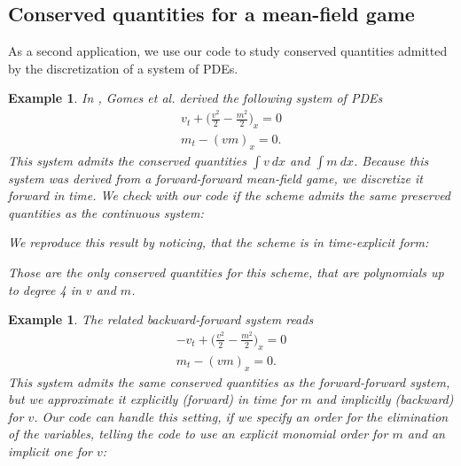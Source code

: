 \documentclass[sigconf,twocolumn]{acmart}
\newcommand{\1}{{\chi}}
\numberwithin{equation}{section}
\theoremstyle{thmlemcorr}
\numberwithin{theorem}{section}
\theoremstyle{thmlemcorr*}
\theoremstyle{defi}
\theoremstyle{remexample}
\newtheorem{example}[theorem]{Example}
\theoremstyle{ass}
\begin{document}
\subsection*{Conserved quantities for a mean-field game}
As a second application, we use our code to study conserved quantities admitted by the discretization of a system of PDEs.
\begin{example}
	In \cite{gomes18}, Gomes et al. derived the following system of PDEs
	\begin{gather*}
		v_t+\Big(\frac{v^2}{2}-\frac{m^2}{2}\Big)_x=0\\
		m_t-(vm)_x=0.
	\end{gather*}
	This system admits the conserved quantities $\int v\ dx$ and $\int m\ dx$.
	Because this system was derived from a forward-forward mean-field game, we discretize it forward in time. We check with our code if the scheme admits the same preserved quantities as the continuous system:
	
	\begin{small}
		
		
	\end{small}
	We reproduce this result by noticing, that the scheme is in time-explicit form:
	
	\begin{small}
		
		
	\end{small}
	Those are the only conserved quantities for this scheme, that are polynomials up to degree 4 in $v$ and $m$.
	
	\begin{small}
		
		
	\end{small}
\end{example}
\begin{example}
	The related backward-forward system reads
	\begin{gather*}
		-v_t+\Big(\frac{v^2}{2}-\frac{m^2}{2}\Big)_x=0\\
		m_t-(vm)_x=0.
	\end{gather*}
	This system admits the same conserved quantities as the forward-forward system, but we approximate it explicitly (forward) in time for $m$ and implicitly (backward) for $v$. Our code can handle this setting, if we specify an order for the elimination of the variables, telling the code to use an explicit monomial order for $m$ and an implicit one for $v$:
	
	\begin{small}
		
		
	\end{small}
\end{example}
\end{document}
